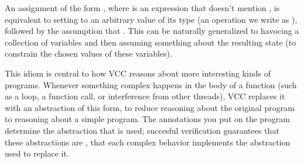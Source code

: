 An assignment of the form , where  is an expression
that doesn't mention , is equivalent to setting  to an
arbitrary value of its type (an operation we write as %
), followed by the assumption that . This can be naturally
generalized to havocing a collection of variables and then assuming
something about the resulting state (to constrain the chosen values of
these variables).

This idiom is central to how VCC reasons about more interesting kinds
of programs. Whenever something complex happens in the body of a
function (such as a loop, a function call, or interference from other
threads), VCC replaces it with an abstraction of this form, to reduce
reasoning about the original program to reasoning about a simple
program.  The annotations you put on the program determine the
abstraction that is used; succesful verification guarantees that these
abstractions are , \ie that each complex behavior
implements the abstraction used to replace it.




